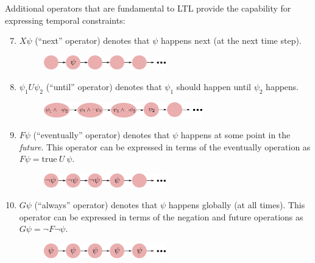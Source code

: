 Additional operators that are fundamental to LTL provide the capability for expressing temporal constraints:
\begin{enumerate}
\setcounter{enumi}{6}
    \item $X \psi$ (``next'' operator) denotes that $\psi$ happens next (at the next time step).
    \begin{figure}[ht]
    \begin{center}
    \includegraphics[width=0.5\textwidth]{tex/figs/ch25_figs/next.png}
    \label{fig:ltl_next}
    \end{center}
    \vspace{-\baselineskip}
    \end{figure}
    \item $\psi_1 U \psi_2$ (``until'' operator) denotes that $\psi_1$ should happen until $\psi_2$ happens.
    \begin{figure}[ht]
    \begin{center}
    \includegraphics[width=0.65\textwidth]{tex/figs/ch25_figs/until.png}
    \label{fig:ltl_until}
    \end{center}
    \vspace{-\baselineskip}
    \end{figure}
    \item $F \psi$ (``eventually'' operator) denotes that $\psi$ happens at some point in the \textit{future}. This operator can be expressed in terms of the eventually operation as $F \psi = \text{true}\: U\: \psi$.
    \begin{figure}[ht]
    \begin{center}
    \includegraphics[width=0.5\textwidth]{tex/figs/ch25_figs/eventually.png}
    \label{fig:ltl_eventually}
    \end{center}
    \vspace{-\baselineskip}
    \end{figure}
    \item $G \psi$ (``always'' operator) denotes that $\psi$ happens globally (at all times). This operator can be expressed in terms of the negation and future operations as $G \psi = \lnot F {\lnot \psi}$.
    \begin{figure}[ht]
    \begin{center}
    \includegraphics[width=0.5\textwidth]{tex/figs/ch25_figs/always.png}
    \label{fig:ltl_always}
    \end{center}
    \vspace{-\baselineskip}
    \end{figure}
\end{enumerate}
